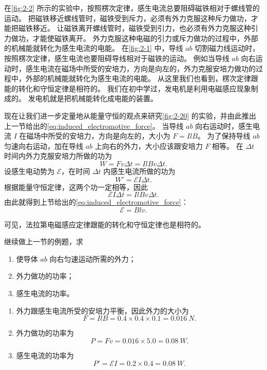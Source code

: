 在\cref{fig:2-2} 所示的实验中，按照楞次定律，感生电流总要阻碍磁铁相对于螺线管的运动。
把磁铁移近螺线管时，磁铁受到斥力，必须有外力克服这种斥力做功，才能把磁铁移近。
让磁铁离开螺线管时，磁铁受到引力，也必须有外力克服这种引力做功，才能使磁铁离开。
外力克服这种电磁的引力或斥力做功的过程中，外部的机械能就转化为感生电流的电能。
在\cref{fig:2-1} 中，导线 $ab$ 切割磁力线运动时，按照楞次定律，感生电流也要阻碍导线相对于磁铁的运动。
例如当导线 $ab$ 向右运动时，感生电流在磁场中所受的安培力，方向是向左的，外力克服安培力做功的过程中，外部的机械能就转化为感生电流的电能。
从这里我们也看到，楞次定律跟能的转化和守恒定律是相符的。
我们在初中学过，发电机是利用电磁感应现象制成的。
发电机就是把机械能转化成电能的装置。

现在让我们进一步定量地从能量守恒的观点来研究\cref{fig:2-20} 的实验，并由此推出上一节给出的\cref{eq:induced_electromotive_force}。
当导线 $ab$ 向右运动时，感生电流 $I$ 在磁场中所受的安培力，方向是向左的，大小为 $F=Il B$。
为了保持导线 $ab$ 匀速向右运动，加在导线 $ab$ 上向右的外力，大小应该跟安培力 $F$ 相等。
在 $\Delta t$ 时间内外力克服安培力所做的功为
\[W=Fv\Delta t=Il Bv\Delta t.\]
设感生电动势为 $\mathcal{E}$，在时间 $\Delta t$ 内感生电流所做的功为
\[W'=\mathcal{E}I\Delta t.\]
根据能量守恒定律，这两个功一定相等，因此
\[\mathcal{E}I\Delta t=Il B v \Delta t.\]
由此就得到上节给出的\cref{eq:induced_electromotive_force}：
\[\mathcal{E}=Bl v.\]

可见，法拉第电磁感应定律跟能的转化和守恒定律也是相符的。

\begin{example}
继续做上一节的例题，求
\begin{enumerate}
    \item 使导体 $ab$ 向右匀速运动所需的外力；
    \item 外力做功的功率；
    \item 感生电流的功率。
\end{enumerate}
\end{example}

\begin{solution}
    \begin{enumerate}
        \item 外力跟感生电流所受的安培力平衡，因此外力的大小为
        \[F=Il B=0.4\times0.4\times0.1=\qty{0.016}{N}.\]
        \item 外力做功的功率为
        \[P=Fv=0.016\times5.0=\qty{0.08}{W}.\]
        \item 感生电流的功率为
        \[P'=\mathcal{E}I=0.2\times0.4=\qty{0.08}{W}.\]
    \end{enumerate}
\end{solution}

